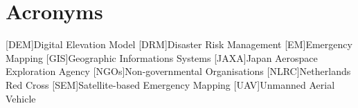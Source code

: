 \chapter*{Acronyms}

\begin{acronym}[UML]
  [DEM]{Digital Elevation Model}
  [DRM]{Disaster Risk Management}
  [EM]{Emergency Mapping}
  [GIS]{Geographic Informations Systems}
  [JAXA]{Japan Aerospace Exploration Agency}
  [NGOs]{Non-governmental Organisations}
  [NLRC]{Netherlands Red Cross}
  [SEM]{Satellite-based Emergency Mapping}
  [UAV]{Unmanned Aerial Vehicle}
\end{acronym}